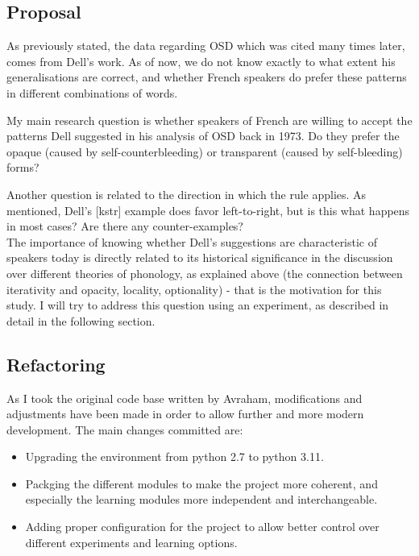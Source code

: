 \documentclass{article}
\begin{document}
\subsection{Proposal} %
As previously stated, the data regarding OSD which was cited many times later, comes from Dell's work. As of now, we do not know exactly to what extent his generalisations are correct, and whether French speakers do prefer these patterns in different combinations of words.

My main research question is whether speakers of French are willing to accept the patterns Dell suggested in his analysis of OSD back in 1973.  Do they prefer the opaque (caused by self-counterbleeding) or transparent (caused by self-bleeding) forms?

Another question is related to the direction in which the rule applies. As mentioned,  Dell's [kstr] example does favor left-to-right, but is this what happens in most cases? Are there any counter-examples?\\

The importance of knowing whether Dell's suggestions are characteristic of speakers today is directly related to its historical significance in the discussion over different theories of phonology,  as explained above (the connection between iterativity and opacity, locality, optionality) - that is the motivation for this study. I will try to address this question using an experiment, as described in detail in the following section.

\clearpage
\subsection{Refactoring}
As I took the original code base written by Avraham, modifications and adjustments have been made in order to allow further and more modern development. The main changes committed are:
\begin{itemize}
  \item Upgrading the environment from python 2.7 to python 3.11.
  \item Packging the different modules to make the project more coherent, and especially the learning modules more independent and interchangeable.
  \item Adding proper configuration for the project to allow better control over different experiments and learning options.
\end{itemize}
\end{document}
